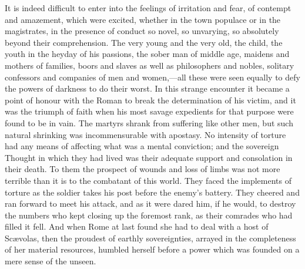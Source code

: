 It is indeed difficult to enter into the feelings of irritation and
fear, of contempt and amazement, which were excited, whether in the
town populace or in the magistrates, in the presence of conduct so
novel, so unvarying, so absolutely beyond their comprehension. The
very young and the very old, the child, the youth in the heyday of his
passions, the sober man of middle age, maidens and mothers of
families, boors and slaves as well as philosophers and nobles,
solitary confessors and companies of men and women,—all these
were seen equally to defy the powers of darkness to do their worst. In
this strange encounter it became a point of honour with the Roman to
break the determination of his victim, and it was the triumph of faith
when his most savage expedients for that purpose were found to be in
vain. The martyrs shrank from suffering like other men, but such
natural shrinking was incommensurable with apostasy. No intensity of
torture had any means of affecting what was a mental conviction; and
the sovereign Thought in which they had lived was their adequate
support and consolation in their death. To them the prospect of wounds
and loss of limbs was not more terrible than it is to the combatant of
this world. They faced the implements of torture as the soldier takes
his post before the enemy's battery. They cheered and ran forward to
meet his attack, and as it were dared him, if he would, to destroy the
numbers who kept closing up the foremost rank, as their comrades who
had filled it fell. And when Rome at last found she had to deal with a
host of Scævolas, then the proudest of earthly sovereignties, arrayed
in the completeness of her material resources, humbled herself before
a power which was founded on a mere sense of the unseen.

